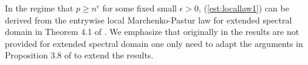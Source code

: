 \documentclass[12pt]{article}
\numberwithin{equation}{section}
\theoremstyle{remark}
\newcommand{\1}{{\rm 1}\kern-0.24em{\rm I}}
\begin{document}
\begin{appendices}
 In the regime that $p\geq n^{\epsilon}$ for some fixed small  $\epsilon>0$, (\ref{est:locallaw1})  can be derived from the entrywise  local Marchenko-Pastur law for extended spectral domain in Theorem 4.1 of  \cite{bloemendal2014isotropic}. We emphasize that originally in \cite{bloemendal2014isotropic} the results are not provided for extended spectral domain
  one only need to adapt the arguments in Proposition 3.8 of \cite{bloemendal2016principal} to extend the results.  
  

\end{appendices}
\end{document}
